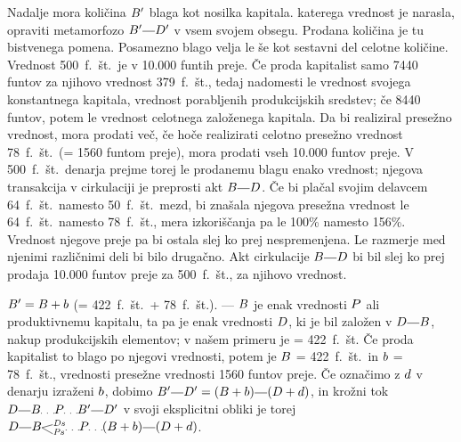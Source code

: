 \documentclass[kapital_02.tex]{subfiles}
\begin{document}
Nadalje mora količina \(B'\) blaga kot nosilka kapitala. katerega vrednost je narasla, opraviti metamorfozo \(\KPEB'\KPEcrta\KPED'\) v vsem svojem obsegu. Prodana količina je tu bistvenega pomena. Posamezno blago velja le še kot sestavni del celotne količine. Vrednost 500~f.~št.\ je v 10.000 funtih preje. Če proda kapitalist samo 7440 funtov za njihovo vrednost 379~f.~št., tedaj nadomesti le vrednost svojega konstantnega kapitala, vrednost porabljenih produkcijskih sredstev; če 8440 funtov, potem le vrednost celotnega založenega kapitala. Da bi realiziral presežno vrednost, mora prodati več, če hoče realizirati celotno presežno vrednost 78~f.~št.\ (= 1560 funtom preje), mora prodati vseh 10.000 funtov preje. V 500~f.~št.\ denarja prejme torej le prodanemu blagu enako vrednost; njegova transakcija v cirkulaciji je preprosti akt \(\KPEB\KPEcrta\KPED\). Če bi plačal svojim delavcem 64~f.~št.\ namesto 50~f.~št.\ mezd, bi znašala njegova presežna vrednost le 64~f.~št.\ namesto 78~f.~št., mera izkoriščanja pa le 100\% namesto 156\%. Vrednost njegove preje pa bi ostala slej ko prej nespremenjena. Le razmerje med njenimi različnimi deli bi bilo drugačno. Akt cirkulacije \(\KPEB\KPEcrta\KPED\) bi bil slej ko prej prodaja 10.000 funtov preje za 500~f.~št., za njihovo vrednost.

\(B' = B + b\) (= 422~f.~št.\ + 78~f.~št.). --- \(B\) je enak vrednosti \(P\) ali produktivnemu kapitalu, ta pa je enak vrednosti \(D\), ki je bil založen v \(\KPED\KPEcrta\KPEB\), nakup produkcijskih elementov; v našem primeru je = 422~f.~št. Če proda kapitalist to blago po njegovi vrednosti, potem je \(B\) = 422~f.~št.\ in \(b\) = 78~f.~št., vrednosti presežne vrednosti 1560 funtov preje. Če označimo z \(d\) v denarju izraženi \(b\), dobimo \(\KPEB'\KPEcrta\KPED' = (\KPEB + \KPEb)\KPEcrta(\KPED+\KPEd)\), in krožni tok \(\KPED\KPEcrta\KPEB\KPEpike\KPEP\KPEpike\KPEB'\KPEcrta\KPED'\) v svoji eksplicitni obliki je torej \(\KPED\KPEcrta\KPEBrazcepDsPs\KPEpike\KPEP\KPEpike(\KPEB + \KPEb)\KPEcrta(\KPED + \KPEd)\).
\end{document}
